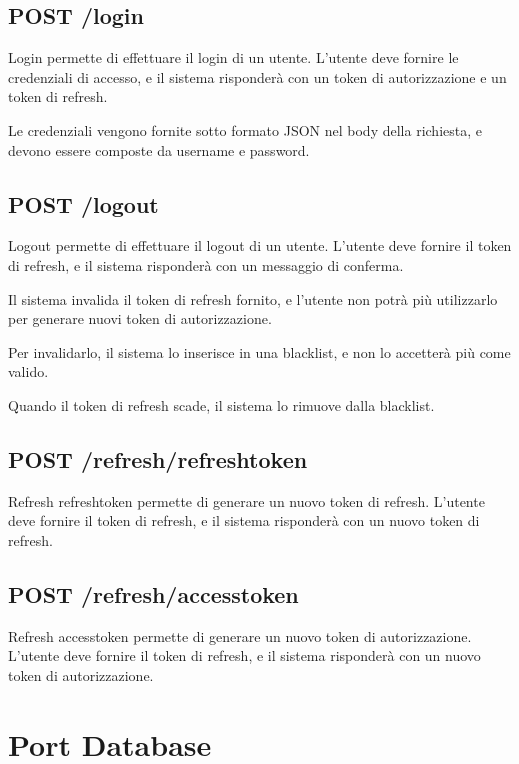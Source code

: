 \subsection{POST /login}

Login permette di effettuare il login di un utente. L'utente deve fornire le credenziali di accesso, e il sistema risponderà con un token di autorizzazione e un token di refresh.

Le credenziali vengono fornite sotto formato JSON nel body della richiesta, e devono essere composte da username e password.


\subsection{POST /logout}

Logout permette di effettuare il logout di un utente. L'utente deve fornire il token di refresh, e il sistema risponderà con un messaggio di conferma.

Il sistema invalida il token di refresh fornito, e l'utente non potrà più utilizzarlo per generare nuovi token di autorizzazione.

Per invalidarlo, il sistema lo inserisce in una blacklist, e non lo accetterà più come valido.

Quando il token di refresh scade, il sistema lo rimuove dalla blacklist.

\subsection{POST /refresh/refreshtoken}

Refresh refreshtoken permette di generare un nuovo token di refresh. L'utente deve fornire il token di refresh, e il sistema risponderà con un nuovo token di refresh.

\subsection{POST /refresh/accesstoken}

Refresh accesstoken permette di generare un nuovo token di autorizzazione. L'utente deve fornire il token di refresh, e il sistema risponderà con un nuovo token di autorizzazione.

\section{Port Database}

